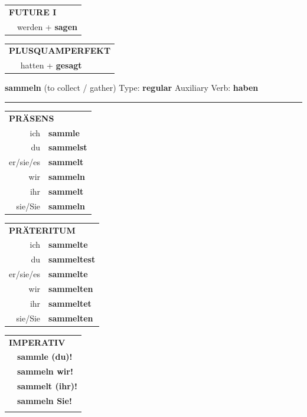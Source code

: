 \documentclass[10pt,a4paper]{revtex4-2}
\begin{document}
\begin{verbbox-acc}
\begin{tabular}{rl}
    \multicolumn{2}{l}{\textbf{FUTURE I} }\\
  &  werden + \textbf{sagen}\\
 
  \end{tabular}
\hfill
   \begin{tabular}{rl}
      \multicolumn{2}{l}{\textbf{PLUSQUAMPERFEKT}}\\
  &  hatten + \textbf{gesagt}\\
  \end{tabular}
  
  \vspace{-5pt}


\end{verbbox-acc}

\begin{verbbox-acc}
    {\Large \bf sammeln} (to collect / gather) \hfill Type: \textbf{regular} \hfill Auxiliary Verb: \textbf{haben} 
    
     \vspace{5pt}

    \hrule
    
    \vspace{5pt}

  \begin{tabular}{rl}
     \multicolumn{2}{l}{\textbf{PRÄSENS} }\\
    ich & \textbf{sammle}\\
    du & \textbf{sammelst}\\
    er/sie/es & \textbf{sammelt}\\
    wir & \textbf{sammeln}\\
    ihr & \textbf{sammelt}\\
    sie/Sie & \textbf{sammeln}\\
  \end{tabular}
  \hfill
  \begin{tabular}{rl}
    \multicolumn{2}{l}{\textbf{PRÄTERITUM} }\\
    ich & \textbf{sammelte}\\
    du & \textbf{sammeltest}\\
    er/sie/es & \textbf{sammelte}\\
    wir & \textbf{sammelten}\\
    ihr & \textbf{sammeltet}\\
    sie/Sie & \textbf{sammelten}\\
  \end{tabular}
  \hfill
  \begin{tabular}{rl}
     \multicolumn{2}{l}{\textbf{IMPERATIV} }\\
   & \textbf{sammle (du)!}\\
   & \textbf{sammeln wir!}\\
   & \textbf{sammelt (ihr)!}\\
   & \textbf{sammeln Sie!}\\
   & \vspace{10pt}
  \end{tabular}


\end{verbbox-acc}
\end{document}

